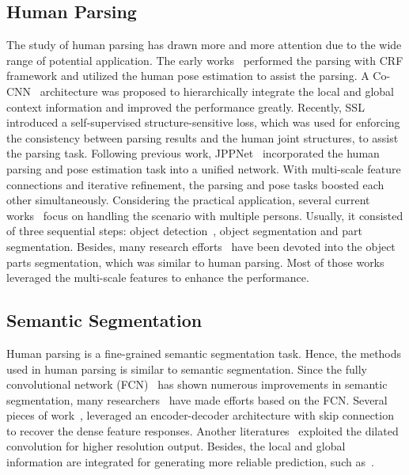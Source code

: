 \documentclass[letterpaper]{article} \usepackage{formatting-instructions-latex-2019}  \usepackage{times}  \usepackage{helvet}  \usepackage{courier}  \usepackage{url}  \usepackage{graphicx}  \frenchspacing  \setlength{\pdfpagewidth}{8.5in}  \setlength{\pdfpageheight}{11in}
\begin{document}
\subsection{Human Parsing}
The study of human parsing has drawn more and more attention due to the wide range of potential application. The early works~\cite{Yamaguchi2012,Dong2013,Simo-Serra2014,Ladicky2013} performed the parsing with CRF framework and utilized the human pose estimation to assist the parsing.  A Co-CNN~\cite{Liang2017} architecture was proposed to hierarchically integrate the local and global context information and improved the performance greatly. Recently, SSL~\cite{Gong2017} introduced a self-supervised structure-sensitive loss, which was used for enforcing the consistency between parsing results and the human joint structures, to assist the parsing task. Following previous work, JPPNet~\cite{Liang2018} incorporated the human parsing and pose estimation task into a unified network. With multi-scale feature connections and iterative refinement, the parsing and pose tasks boosted each other simultaneously. Considering the practical application, several current works~\cite{Li2017a,Li2017,Zhao2018} focus on handling the scenario with multiple persons. Usually, it consisted of three sequential steps: object detection~\cite{he2017mask}, object segmentation and part segmentation. Besides, many research efforts~\cite{Girshick2014,Wang2015,Chen2016a,Hariharan2015} have been devoted into the object parts segmentation, which was similar to human parsing. Most of those works leveraged the multi-scale features to enhance the performance.
  
\subsection{Semantic Segmentation}

Human parsing is a fine-grained semantic segmentation task. Hence, the methods used in human parsing is similar to semantic segmentation. Since the fully convolutional network (FCN)~\cite{Long2015} has shown numerous improvements in semantic segmentation, many researchers~\cite{Chen2016,Jegou2017,wei2018revisiting,wei2017object,wei2017stc} have made efforts based on the FCN. Several pieces of work~\cite{Badrinarayanan2017,Ronneberger2015,Lin2017}, leveraged an encoder-decoder architecture with skip connection to recover the dense feature responses. Another literatures~\cite{Chen2016,YuKoltun2016,Chen2018a} exploited the dilated convolution for higher resolution output. Besides, the local and global information are integrated for generating more reliable prediction, such as~\cite{Chen2018,Zhao2017}. 
\end{document}
